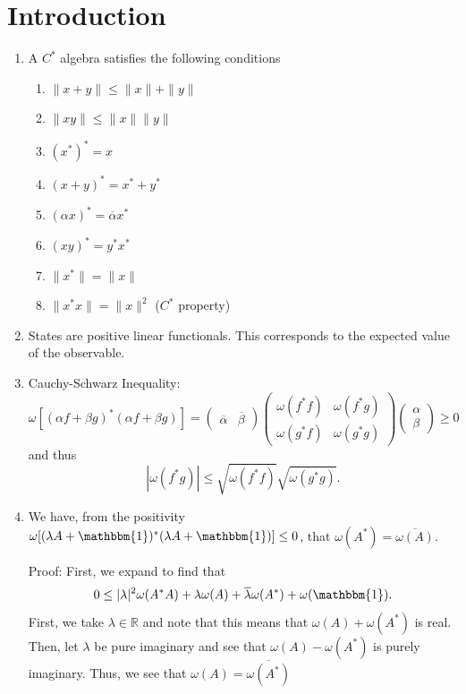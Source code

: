 \documentclass[twoside,symmetric, openany, 12pt]{./tuftebook}
\theoremstyle{definition}
\theoremstyle{definition}
\theoremstyle{definition}
\newcommand{\R}{\mathbb{R}}
\begin{document}
\section{Introduction}
\begin{enumerate}
	\item A $C^*$ algebra satisfies the following conditions
		\begin{enumerate}[label=(\arabic*)]
			\item $\|x+y\|\le \|x\|+\|y\|$ 
			\item $\|xy\|\le \|x\|\|y\|$
			\item $(x^*)^* = x$ 
			\item $(x+y)^*=x^*+y^*$ 
			\item $(\alpha x)^* = \overline{\alpha}x^*$ 
			\item $(xy)^* =y^*x^*$ 
			\item $\|x^*\|= \|x\|$ 
			\item $\|x^*x\|=\|x\|^2$ ($C^*$ property)
		\end{enumerate}
	\item States are positive linear functionals. This corresponds to the expected value of the observable.
	\item Cauchy-Schwarz Inequality:
		\[
			\omega[(\alpha f + \beta g)^*(\alpha f + \beta g)] = \begin{pmatrix} \overline{\alpha} & \overline{\beta} \end{pmatrix} \begin{pmatrix} \omega(f^*f) & \omega(f^* g) \\ \omega(g^* f) & \omega(g^* g) \end{pmatrix} \begin{pmatrix} \alpha \\ \beta \end{pmatrix} \ge 0
		\]
		and thus
		\[
		|\omega(f^* g)| \le \sqrt{\omega(f^* f)} \sqrt{\omega(g^* g)} 
		.\] 
	\item We have, from the positivity $\omega[(\lambda A + \mathbbm{1})^* (\lambda A + \mathbbm{1})] \le 0$, that $\omega(A^*) = \overline{\omega(A)}$. 

		Proof: First, we expand to find that
		\[
			0\le |\lambda|^2\omega(A^* A)+\lambda\omega(A)+\overline{\lambda}\omega(A^*)+\omega(\mathbbm{1})
		.\] 
		First, we take $\lambda\in \R$ and note that this means that $\omega(A) +\omega(A^*)$ is real. Then, let $\lambda$ be pure imaginary and see that $\omega(A)-\omega(A^*)$ is purely imaginary. Thus, we see that $\omega(A) = \overline{\omega(A^*)}$
\end{enumerate}
\end{document}
